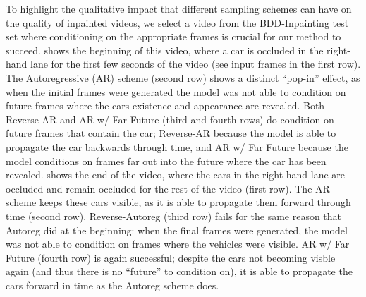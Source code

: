 To highlight the qualitative impact that different sampling schemes can have on the quality of inpainted videos, we select a video from the BDD-Inpainting test set where conditioning on the appropriate frames is crucial for our method to succeed.  shows the beginning of this video, where a car is occluded in the right-hand lane for the first few seconds of the video (see input frames in the first row). The Autoregressive (AR) scheme (second row) shows a distinct ``pop-in'' effect, as when the initial frames were generated the model was not able to condition on future frames where the cars existence and appearance are revealed. Both Reverse-AR and AR w/ Far Future (third and fourth rows) do condition on future frames that contain the car; Reverse-AR because the model is able to propagate the car backwards through time, and AR w/ Far Future because the model conditions on frames far out into the future where the car has been revealed.  shows the end of the video, where the cars in the right-hand lane are occluded and remain occluded for the rest of the video (first row). The AR scheme keeps these cars visible, as it is able to propagate them forward through time (second row). Reverse-Autoreg (third row) fails for the same reason that Autoreg did at the beginning: when the final frames were generated, the model was not able to condition on frames where the vehicles were visible. AR w/ Far Future (fourth row) is again successful; despite the cars not becoming visble again (and thus there is no ``future'' to condition on), it is able to propagate the cars forward in time as the Autoreg scheme does. 



\begin{table}
\centering
\caption{Effect of sampling schemes, measured on the Traffic-Scenes test set.}
\label{table:samplingschemes}
\end{table}

